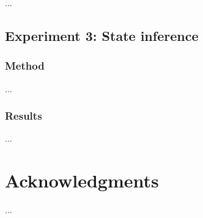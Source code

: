 \documentclass[10pt,letterpaper]{article}
\begin{document}
...

\subsection{Experiment 3: State inference}

\subsubsection{Method}

...

\subsubsection{Results}

...


\section{Acknowledgments}

...



\setlength{\bibleftmargin}{.125in}
\setlength{\bibindent}{-\bibleftmargin}


\end{document}
